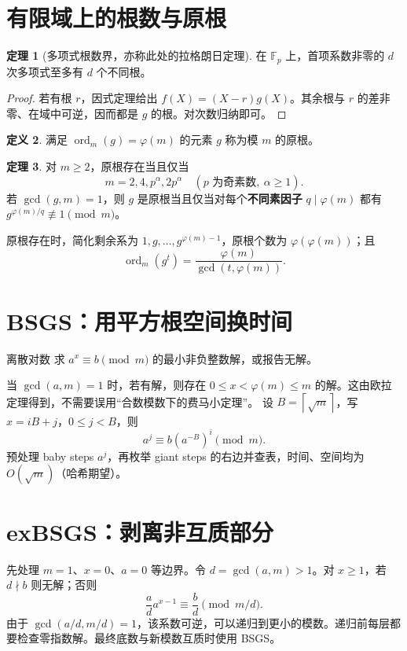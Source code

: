 \documentclass[UTF8,a4paper,11pt,oneside,openany,fontset=fandol]{ctexbook}
\theoremstyle{definition}
\newtheorem{definition}{定义}[chapter]
\newtheorem{theorem}[definition]{定理}
\newcommand{\ord}{\operatorname{ord}}
\newcommand{\ceil}[1]{\left\lceil #1\right\rceil}
\begin{document}
\section{有限域上的根数与原根}
\begin{theorem}[多项式根数界，亦称此处的拉格朗日定理]
在 $\mathbb F_p$ 上，首项系数非零的 $d$ 次多项式至多有 $d$ 个不同根。
\end{theorem}
\begin{proof}
若有根 $r$，因式定理给出 $f(X)=(X-r)g(X)$。其余根与 $r$ 的差非零、在域中可逆，因而都是 $g$ 的根。对次数归纳即可。
\end{proof}


\begin{definition}
满足 $\ord_m(g)=\varphi(m)$ 的元素 $g$ 称为模 $m$ 的原根。
\end{definition}
\begin{theorem}
对 $m\ge2$，原根存在当且仅当
\[
 m=2,4,p^\alpha,2p^\alpha\quad(p\text{ 为奇素数},\ \alpha\ge1).
\]
若 $\gcd(g,m)=1$，则 $g$ 是原根当且仅当对每个\textbf{不同素因子} $q\mid\varphi(m)$ 都有 $g^{\varphi(m)/q}\not\equiv1\pmod m$。
\end{theorem}
原根存在时，简化剩余系为 $1,g,\ldots,g^{\varphi(m)-1}$，原根个数为 $\varphi(\varphi(m))$；且
\[
 \ord_m(g^t)=\frac{\varphi(m)}{\gcd(t,\varphi(m))}.
\]


\section{BSGS：用平方根空间换时间}
\begin{problem}{离散对数}
求 $a^x\equiv b\pmod m$ 的最小非负整数解，或报告无解。
\end{problem}
当 $\gcd(a,m)=1$ 时，若有解，则存在 $0\le x<\varphi(m)\le m$ 的解。这由欧拉定理得到，不需要误用“合数模数下的费马小定理”。
设 $B=\ceil{\sqrt m}$，写 $x=iB+j$，$0\le j<B$，则
\[
 a^j\equiv b(a^{-B})^i\pmod m.
\]
预处理 baby steps $a^j$，再枚举 giant steps 的右边并查表，时间、空间均为 $O(\sqrt m)$（哈希期望）。



\section{exBSGS：剥离非互质部分}
先处理 $m=1$、$x=0$、$a=0$ 等边界。令 $d=\gcd(a,m)>1$。对 $x\ge1$，若 $d\nmid b$ 则无解；否则
\[
 \frac ad a^{x-1}\equiv\frac bd\pmod{m/d}.
\]
由于 $\gcd(a/d,m/d)=1$，该系数可逆，可以递归到更小的模数。递归前每层都要检查零指数解。最终底数与新模数互质时使用 BSGS。
\end{document}
